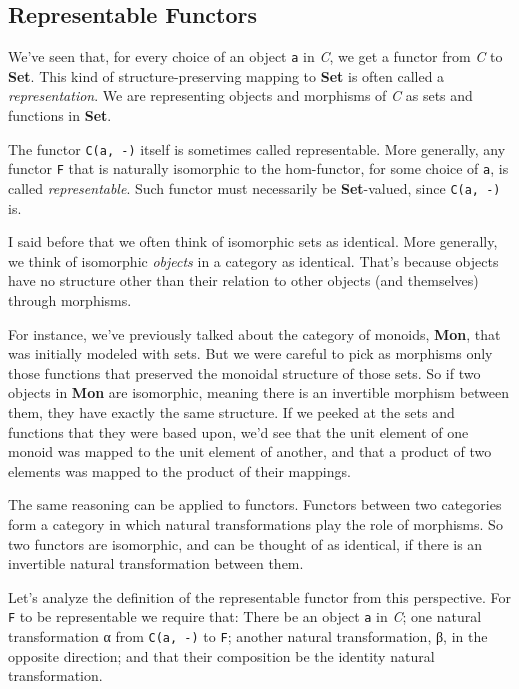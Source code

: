 \subsection{Representable Functors}\label{representable-functors}

We've seen that, for every choice of an object \texttt{a} in \emph{C},
we get a functor from \emph{C} to \textbf{Set}. This kind of
structure-preserving mapping to \textbf{Set} is often called a
\emph{representation}. We are representing objects and morphisms of
\emph{C} as sets and functions in \textbf{Set}.

The functor \texttt{C(a,\ -)} itself is sometimes called representable.
More generally, any functor \texttt{F} that is naturally isomorphic to
the hom-functor, for some choice of \texttt{a}, is called
\emph{representable}. Such functor must necessarily be
\textbf{Set}-valued, since \texttt{C(a,\ -)} is.

I said before that we often think of isomorphic sets as identical. More
generally, we think of isomorphic \emph{objects} in a category as
identical. That's because objects have no structure other than their
relation to other objects (and themselves) through morphisms.

For instance, we've previously talked about the category of monoids,
\textbf{Mon}, that was initially modeled with sets. But we were careful
to pick as morphisms only those functions that preserved the monoidal
structure of those sets. So if two objects in \textbf{Mon} are
isomorphic, meaning there is an invertible morphism between them, they
have exactly the same structure. If we peeked at the sets and functions
that they were based upon, we'd see that the unit element of one monoid
was mapped to the unit element of another, and that a product of two
elements was mapped to the product of their mappings.

The same reasoning can be applied to functors. Functors between two
categories form a category in which natural transformations play the
role of morphisms. So two functors are isomorphic, and can be thought of
as identical, if there is an invertible natural transformation between
them.

Let's analyze the definition of the representable functor from this
perspective. For \texttt{F} to be representable we require that: There
be an object \texttt{a} in \emph{C}; one natural transformation α from
\texttt{C(a,\ -)} to \texttt{F}; another natural transformation, β, in
the opposite direction; and that their composition be the identity
natural transformation.

